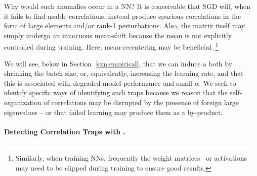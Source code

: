 Why would such anomalies  occur in a NN?
It is conceivable that SGD will, when it fails to find usable correlations, instead
produce spurious
correlations in the form of large elements and/or rank-1 perturbations.
Also, the matrix itself may simply undergo an innocuous  mean-shift because the
mean is not explicitly controlled during training. Here,  mean-recentering may be beneficial.
\footnote{Similarly, when training NNs, frequently the weight matrices~\cite{baskin2021} or activations~\cite{choi2018_TR}
may need to be clipped during training to ensure good results.}

We will see, below in Section~\ref{sxn:empirical}, that we can induce a \CorrelationTrap both by shrinking the batch 
size, or, equivalently, increasing the learning rate, and that this is associated with degraded model performance
and small $\alpha$.
We seek to identify specific ways of identifying such traps because we 
reason that the self-organization of correlations may be disrupted by the presence of foreign large eigenvalues – or that failed learning may produce them as a by-product.

\paragraph{Detecting Correlation Traps with \RMT.}

